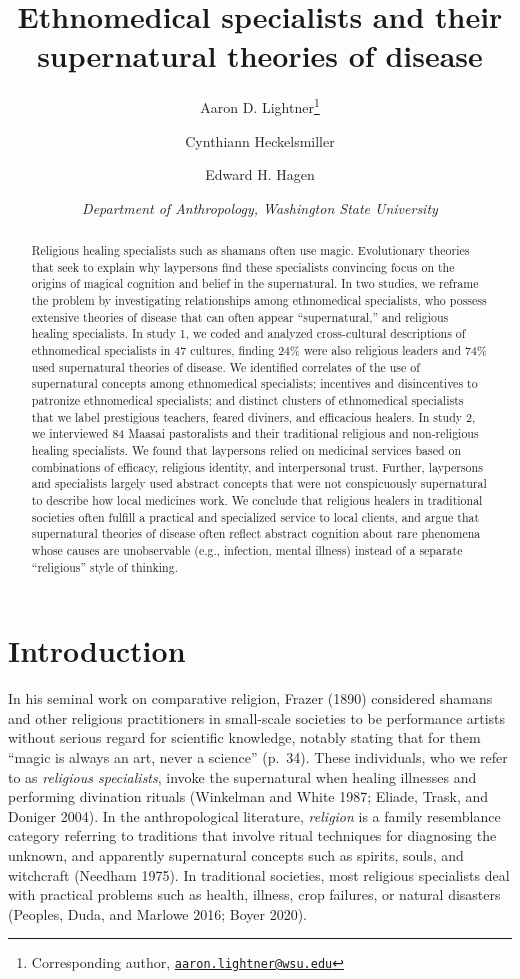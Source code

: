 \documentclass[
  11pt,
]{article}
\title{\LARGE \textbf{Ethnomedical specialists and their supernatural theories of disease}}
\author{Aaron D. Lightner\footnote{Corresponding author, \href{mailto:aaron.lightner@wsu.edu}{\nolinkurl{aaron.lightner@wsu.edu}}} \and Cynthiann Heckelsmiller \and Edward H. Hagen}
\date{\emph{Department of Anthropology, Washington State University}}
\begin{document}
\maketitle
\begin{abstract}
Religious healing specialists such as shamans often use magic. Evolutionary theories that seek to explain why laypersons find these specialists convincing focus on the origins of magical cognition and belief in the supernatural. In two studies, we reframe the problem by investigating relationships among ethnomedical specialists, who possess extensive theories of disease that can often appear ``supernatural,'' and religious healing specialists. In study 1, we coded and analyzed cross-cultural descriptions of ethnomedical specialists in 47 cultures, finding 24\% were also religious leaders and 74\% used supernatural theories of disease. We identified correlates of the use of supernatural concepts among ethnomedical specialists; incentives and disincentives to patronize ethnomedical specialists; and distinct clusters of ethnomedical specialists that we label prestigious teachers, feared diviners, and efficacious healers. In study 2, we interviewed 84 Maasai pastoralists and their traditional religious and non-religious healing specialists. We found that laypersons relied on medicinal services based on combinations of efficacy, religious identity, and interpersonal trust. Further, laypersons and specialists largely used abstract concepts that were not conspicuously supernatural to describe how local medicines work. We conclude that religious healers in traditional societies often fulfill a practical and specialized service to local clients, and argue that supernatural theories of disease often reflect abstract cognition about rare phenomena whose causes are unobservable (e.g., infection, mental illness) instead of a separate ``religious'' style of thinking.
\end{abstract}

\hypertarget{introduction}{%
\section{Introduction}\label{introduction}}

In his seminal work on comparative religion, Frazer (1890) considered shamans and other religious practitioners in small-scale societies to be performance artists without serious regard for scientific knowledge, notably stating that for them ``magic is always an art, never a science'' (p.~34). These individuals, who we refer to as \emph{religious specialists}, invoke the supernatural when healing illnesses and performing divination rituals (Winkelman and White 1987; Eliade, Trask, and Doniger 2004). In the anthropological literature, \emph{religion} is a family resemblance category referring to traditions that involve ritual techniques for diagnosing the unknown, and apparently supernatural concepts such as spirits, souls, and witchcraft (Needham 1975). In traditional societies, most religious specialists deal with practical problems such as health, illness, crop failures, or natural disasters (Peoples, Duda, and Marlowe 2016; Boyer 2020).
\end{document}
